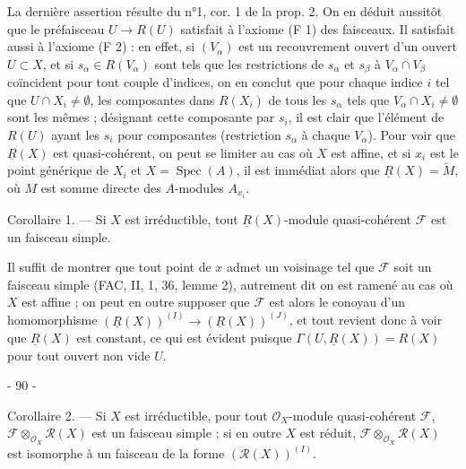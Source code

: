 La dernière assertion résulte du n°1, cor. 1 de la prop. 2. On en déduit aussitôt que le préfaisceau $U \to R(U)$ satisfait à l'axiome (F 1) des faisceaux. Il satisfait aussi à l'axiome (F 2) : en effet, si $(V_\alpha)$ est un recouvrement ouvert d'un ouvert $U \subset X$, et si $s_\alpha \in R(V_\alpha)$ sont tels que les restrictions de $s_\alpha$ et $s_\beta$ à $V_\alpha \cap V_\beta$ coïncident pour tout couple d'indices, on en conclut que pour chaque indice $i$ tel que $U \cap X_i \neq \emptyset$, les composantes dans $R(X_i)$ de tous les $s_\alpha$ tels que $V_\alpha \cap X_i \neq \emptyset$ sont les mêmes ; désignant cette composante par $s_i$, il est clair que l'élément de $R(U)$ ayant les $s_i$ pour composantes (restriction $s_\alpha$ à chaque $V_\alpha$). Pour voir que $\underline{R}(X)$ est quasi-cohérent, on peut se limiter au cas où $X$ est affine, et si $x_i$ est le point générique de $X_i$ et $X = \operatorname{Spec}(A)$, il est immédiat alors que $\underline{R}(X) = \tilde{M}$, où $M$ est somme directe des $A$-modules $A_{x_i}$.

Corollaire 1. — Si $X$ est irréductible, tout $\underline{R}(X)$-module quasi-cohérent $\mathcal{F}$ est un faisceau simple.

Il suffit de montrer que tout point de $x$ admet un voisinage tel que $\mathcal{F}$ soit un faisceau simple (FAC, II, 1, 36, lemme 2), autrement dit on est ramené au cas où $X$ est affine ; on peut en outre supposer que $\mathcal{F}$ est alors le conoyau d'un homomorphisme $(\underline{R}(X))^{(I)} \to (\underline{R}(X))^{(J)}$, et tout revient donc à voir que $\underline{R}(X)$ est constant, ce qui est évident puisque $\Gamma(U, \underline{R}(X)) = R(X)$ pour tout ouvert non vide $U$.

\newpage


- 90 -

Corollaire 2. — Si $X$ est irréductible, pour tout $\mathcal{O}_X$-module quasi-cohérent $\mathcal{F}$, $\mathcal{F} \otimes_{\mathcal{O}_X} \mathcal{R}(X)$ est un faisceau simple ; si en outre $X$ est réduit, $\mathcal{F} \otimes_{\mathcal{O}_X} \mathcal{R}(X)$ est isomorphe à un faisceau de la forme $(\mathcal{R}(X))^{(I)}$.

